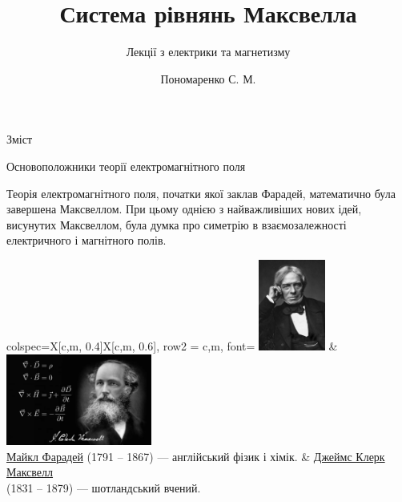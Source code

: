 \documentclass[onlytextwidth]{beamer}
\title[Лекції електрики та магнетизму]{\huge\bfseries Система рівнянь Максвелла}
\subtitle{Лекції з електрики та магнетизму}
\author{Пономаренко С. М.}
\date{}
\begin{document}
\begin{frame}[plain]
	\maketitle
\end{frame}

\begin{frame}{Зміст}{}
	\tableofcontents
\end{frame}




\begin{frame}{Основоположники теорії електромагнітного поля}{}
	\begin{block}{}\justifying
		Теорія електромагнітного поля, початки якої заклав \alert{Фарадей}, математично була завершена \alert{Максвеллом}. При цьому однією з найважливіших
		нових ідей, висунутих Максвеллом, була думка про симетрію в взаємозалежності електричного і магнітного полів.
	\end{block}

	\begin{tblr}{
		colspec={X[c,m, 0.4\linewidth]X[c,m, 0.6\linewidth]},
		row{2} = {c,m, font=\small}
		}
		\includegraphics[height=3cm]{Faraday} & \includegraphics[height=3cm]{james-clerk-maxwell} \\
		\href{https://en.wikipedia.org/wiki/Michael_Faraday}{Майкл Фарадей} (1791 -- 1867) --- англійський фізик і хімік.
		                                      &
		{\href{https://en.wikipedia.org/wiki/James_Clerk_Maxwell}{Джеймс Клерк Максвелл}          \\ (1831 -- 1879) --- шотландський вчений.}
	\end{tblr}
\end{frame}
\end{document}
